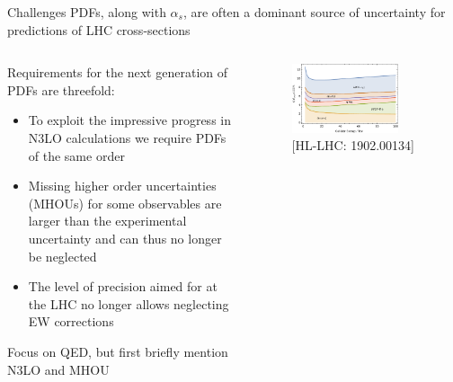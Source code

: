 \documentclass[aspectratio=169, 8pt,t]{beamer}
\begin{document}
\begin{frame}{Challenges}
  PDFs, along with $\alpha_s$, are often a dominant source of uncertainty for predictions of LHC cross-sections 
  \begin{columns}
    \begin{column}{0.49\textwidth}
      \vspace*{1em}

      Requirements for the next generation of PDFs are threefold:
      \begin{itemize}
        \item To exploit the impressive progress in N3LO calculations we require PDFs of the same order
        \item Missing higher order uncertainties (MHOUs) for some observables are larger than the experimental uncertainty and can thus no longer be neglected
        \item The level of precision aimed for at the LHC no longer allows neglecting EW corrections
      \end{itemize}

      \vspace*{1em}
      Focus on QED, but first briefly mention N3LO and MHOU
    \end{column}

    \begin{column}{0.49\textwidth}
      \begin{figure}
        \includegraphics[width=0.8\textwidth]{figures/sources_of_unceratinty.pdf}
        \caption*{\color{gray}\small [HL-LHC: 1902.00134]}
      \end{figure}
    \end{column}
  \end{columns}
\end{frame}


\end{document}
